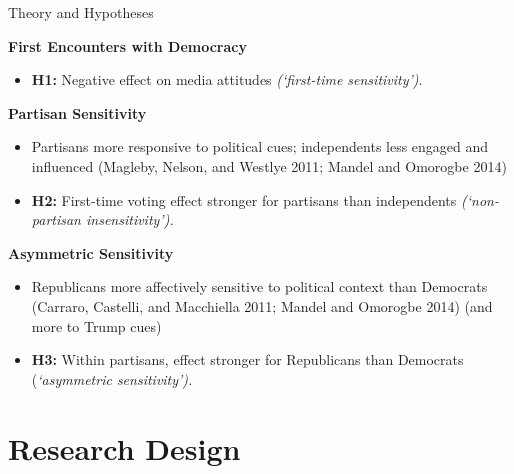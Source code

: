 \documentclass[
  ignorenonframetext,
]{beamer}
\providecommand{\tightlist}{%
  \setlength{\itemsep}{0pt}\setlength{\parskip}{0pt}}
\begin{document}
\begin{frame}{Theory and Hypotheses}
\label{theory-and-hypotheses}
\small

\textbf{First Encounters with Democracy}

\begin{itemize}
\tightlist
\item
  \textbf{H1:} Negative effect on media attitudes \emph{(`first-time
  sensitivity')}.
\end{itemize}

\textbf{Partisan Sensitivity}

\begin{itemize}
\item
  Partisans more responsive to political cues; independents less engaged
  and influenced (Magleby, Nelson, and Westlye 2011; Mandel and Omorogbe
  2014)
\item
  \textbf{H2:} First-time voting effect stronger for partisans than
  independents \emph{(`non-partisan insensitivity').}
\end{itemize}

\textbf{Asymmetric Sensitivity}

\begin{itemize}
\tightlist
\item
  Republicans more affectively sensitive to political context than
  Democrats (Carraro, Castelli, and Macchiella 2011; Mandel and Omorogbe
  2014) (and more to Trump cues)
\item
  \textbf{H3:} Within partisans, effect stronger for Republicans than
  Democrats (\emph{`asymmetric sensitivity').}
\end{itemize}

\normalsize
\end{frame}

\section{Research Design}\label{research-design}
\end{document}

